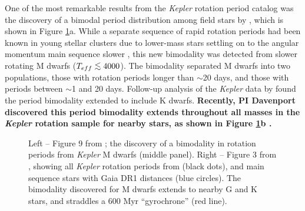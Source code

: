 \documentclass[12pt]{article}
\newcommand{\Kepler}{\textsl{Kepler}\xspace}
\def\lesssim{\mathrel{\hbox{\rlap{\hbox{\lower3pt\hbox{$\sim$}}}\hbox{\raise2pt\hbox{$<$}}}}}
\begin{document}
One of the most remarkable results from the \Kepler rotation period catalog was the discovery of a bimodal period distribution among field stars by \citet{mcquillan2013}, which is shown in Figure \ref{fig:bimodal}a. While a separate sequence of rapid rotation periods had been known in young stellar clusters due to lower-mass stars settling on to the angular momentum main sequence slower \citep[e.g.][]{barnes2007}, this new bimodality was detected from slower rotating M dwarfs ($T_{eff}\lesssim4000$). The bimodality separated M dwarfs into two populations, those with rotation periods longer than $\sim$20 days, and those with periods between $\sim$1 and 20 days. Follow-up analysis of the \Kepler data by \citet{mcquillan2014} found the period bimodality extended to include K dwarfs. {\bf Recently, PI Davenport discovered this period bimodality extends throughout all masses in the \Kepler rotation sample for nearby stars, as shown in Figure \ref{fig:bimodal}b \citep{davenport2017}.} %

\begin{figure}[!th]
\centering
{}
\caption{
Left -- Figure 9 from \citet{mcquillan2013}; the discovery of a bimodality in rotation periods from \Kepler M dwarfs (middle panel).
Right -- Figure 3 from \citet{davenport2017}, showing all \Kepler rotation periods from \citet{mcquillan2014} (black dots), and main sequence stars with Gaia DR1 distances (blue circles). The bimodality discovered for M dwarfs extends to nearby G and K stars, and straddles a 600 Myr ``gyrochrone'' (red line).
}
\label{fig:bimodal}
\end{figure}
\end{document}
